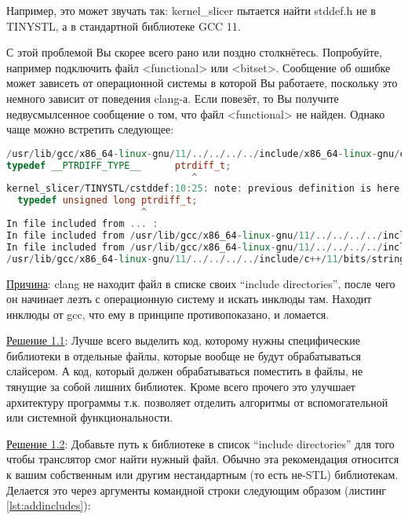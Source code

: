 \documentclass[11pt,fleqn,english,russian]{report} %
\begin{document}
Например, это может звучать так: kernel\_slicer пытается найти stddef.h не в TINYSTL, а в стандартной библиотеке GCC 11. 

С этой проблемой Вы скорее всего рано или поздно столкнётесь. Попробуйте, например подключить  файл <functional> или <bitset>. Сообщение об ошибке может зависеть от операционной системы в которой Вы работаете, поскольку это немного зависит от поведения clang-а. Если повезёт, то Вы получите недвусмылсенное сообщение о том, что файл <functional> не найден. Однако чаще можно встретить следующее:

\begin{lstlisting}[language=C++, 
	caption=ошибка из-за ненайденного файла bitset из STL, 
	label=lst:filenotfound]	
/usr/lib/gcc/x86_64-linux-gnu/11/../../../../include/x86_64-linux-gnu/c++/11/bits/c++config.h:281:28: error: typedef redefinition with different types ('long' vs 'unsigned long')
typedef __PTRDIFF_TYPE__      ptrdiff_t;
                                 ^
kernel_slicer/TINYSTL/cstddef:10:25: note: previous definition is here
  typedef unsigned long ptrdiff_t;
                        ^
In file included from ... :
In file included from /usr/lib/gcc/x86_64-linux-gnu/11/../../../../include/c++/11/bitset:50:
In file included from /usr/lib/gcc/x86_64-linux-gnu/11/../../../../include/c++/11/iosfwd:39:
/usr/lib/gcc/x86_64-linux-gnu/11/../../../../include/c++/11/bits/stringfwd.h:79:33: error: typedef redefinition with different types ('basic_string<char>' vs 'str::string_base<char>')
\end{lstlisting}

\noindent\underline{Причина}: clang не находит файл в списке своих ``include directories'', после чего он начинает лезть с операционную систему и искать инклюды там. Находит инклюды от gcc, что ему в принципе противопоказано, и ломается. 

\vspace*{5px}
\noindent\underline{Решение 1.1}: Лучше всего выделить код, которому нужны специфические библиотеки в отдельные файлы, которые вообще не будут обрабатываться слайсером. А код, который должен обрабатываться поместить в файлы, не тянущие за собой лишних библиотек. Кроме всего прочего это улучшает архитектуру программы т.к. позволяет отделить алгоритмы от вспомогательной или системной функциональности.

\vspace*{5px}
\noindent\underline{Решение 1.2}: Добавьте путь к библиотеке в список ``include directories'' для того чтобы транслятор смог найти нужный файл. Обычно эта рекомендация относится к вашим собственным или другим нестандартным (то есть не-STL) библиотекам. Делается это через аргументы командной строки следующим образом (листинг \ref{lst:addincludes}):
\end{document}
